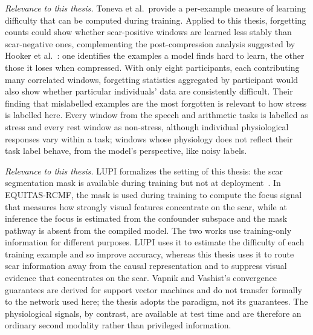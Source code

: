 \textit{Relevance to this thesis.} Toneva et al.\ provide a per-example measure of learning difficulty that can be computed during training. Applied to this thesis, forgetting counts could show whether scar-positive windows are learned less stably than scar-negative ones, complementing the post-compression analysis suggested by Hooker et al.~\cite{hooker2019}: one identifies the examples a model finds hard to learn, the other those it loses when compressed. With only eight participants, each contributing many correlated windows, forgetting statistics aggregated by participant would also show whether particular individuals' data are consistently difficult. Their finding that mislabelled examples are the most forgotten is relevant to how stress is labelled here. Every window from the speech and arithmetic tasks is labelled as stress and every rest window as non-stress, although individual physiological responses vary within a task; windows whose physiology does not reflect their task label behave, from the model's perspective, like noisy labels.


\textit{Relevance to this thesis.} LUPI formalizes the setting of this thesis: the scar segmentation mask is available during training but not at deployment~\cite{vapnik2009, vapnik2015}. In EQUITAS-RCMF, the mask is used during training to compute the focus signal that measures how strongly visual features concentrate on the scar, while at inference the focus is estimated from the confounder subspace and the mask pathway is absent from the compiled model. The two works use training-only information for different purposes. LUPI uses it to estimate the difficulty of each training example and so improve accuracy, whereas this thesis uses it to route scar information away from the causal representation and to suppress visual evidence that concentrates on the scar. Vapnik and Vashist's convergence guarantees are derived for support vector machines and do not transfer formally to the network used here; the thesis adopts the paradigm, not its guarantees. The physiological signals, by contrast, are available at test time and are therefore an ordinary second modality rather than privileged information.


